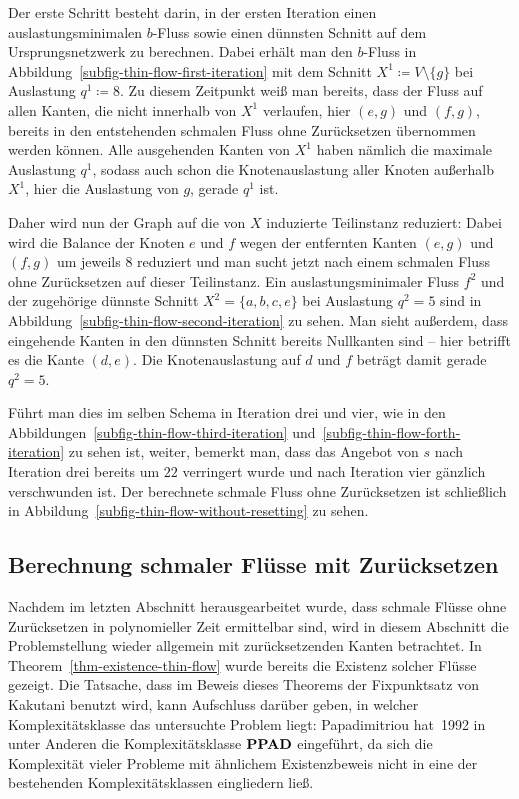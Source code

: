 \begin{example}
	Der erste Schritt besteht darin, in der ersten Iteration einen auslastungsminimalen $b$-Fluss sowie einen dünnsten Schnitt auf dem Ursprungsnetzwerk zu berechnen.
	Dabei erhält man den $b$-Fluss in Abbildung~\ref{subfig-thin-flow-first-iteration} mit dem Schnitt $X^1\coloneq V \setminus \{ g \}$ bei Auslastung $q^1 \coloneq 8$.
	Zu diesem Zeitpunkt weiß man bereits, dass der Fluss auf allen Kanten, die nicht innerhalb von $X^1$ verlaufen, hier $(e,g)$ und $(f,g)$, bereits in den entstehenden schmalen Fluss ohne Zurücksetzen übernommen werden können.
	Alle ausgehenden Kanten von $X^1$ haben nämlich die maximale Auslastung $q^1$, sodass auch schon die Knotenauslastung aller Knoten außerhalb $X^1$, hier die Auslastung von $g$, gerade $q^1$ ist.

	Daher wird nun der Graph auf die von $X$ induzierte Teilinstanz reduziert:
	Dabei wird die Balance der Knoten $e$ und $f$ wegen der entfernten Kanten $(e,g)$ und $(f,g)$ um jeweils $8$ reduziert und man sucht jetzt nach einem schmalen Fluss ohne Zurücksetzen auf dieser Teilinstanz.
	Ein auslastungsminimaler Fluss $f^2$ und der zugehörige dünnste Schnitt $X^2 = \{ a, b, c, e \}$ bei Auslastung $q^2 = 5$ sind in Abbildung~\ref{subfig-thin-flow-second-iteration} zu sehen.
	Man sieht außerdem, dass eingehende Kanten in den dünnsten Schnitt bereits Nullkanten sind -- hier betrifft es die Kante $(d,e)$.
	Die Knotenauslastung auf $d$ und $f$ beträgt damit gerade $q^2=5$.
	
	Führt man dies im selben Schema in Iteration drei und vier, wie in den Abbildungen~\ref{subfig-thin-flow-third-iteration} und~\ref{subfig-thin-flow-forth-iteration} zu sehen ist, weiter, bemerkt man, dass das Angebot von $s$ nach Iteration drei bereits um $22$ verringert wurde und nach Iteration vier gänzlich verschwunden ist.
	Der berechnete schmale Fluss ohne Zurücksetzen ist schließlich in Abbildung~\ref{subfig-thin-flow-without-resetting} zu sehen.
\end{example}

\subsection{Berechnung schmaler Flüsse mit Zurücksetzen}

\newcommand{\EndOfTheLine}{\textit{\textsc{EndOfALine}}}

Nachdem im letzten Abschnitt herausgearbeitet wurde, dass schmale Flüsse ohne Zurücksetzen in polynomieller Zeit ermittelbar sind, wird in diesem Abschnitt die Problemstellung wieder allgemein mit zurücksetzenden Kanten betrachtet.
In Theorem~\ref{thm-existence-thin-flow} wurde bereits die Existenz solcher Flüsse gezeigt.
Die Tatsache, dass im Beweis dieses Theorems der Fixpunktsatz von Kakutani benutzt wird, kann Aufschluss darüber geben, in welcher Komplexitätsklasse das untersuchte Problem liegt:
Papadimitriou hat~1992 in~\cite{PPAD1994} unter Anderen die Komplexitätsklasse $\textbf{PPAD}$ eingeführt, da sich die Komplexität vieler Probleme mit ähnlichem Existenzbeweis nicht in eine der bestehenden Komplexitätsklassen eingliedern ließ.

